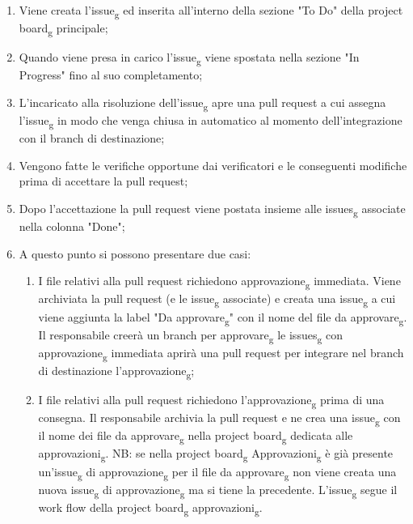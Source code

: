 \begin{enumerate}
	\item Viene creata l'issue\textsubscript{g} ed inserita all'interno della sezione "To Do" della project board\textsubscript{g} principale;
	\item Quando viene presa in carico l'issue\textsubscript{g} viene spostata nella sezione "In Progress" fino al suo completamento;
	\item L'incaricato alla risoluzione dell'issue\textsubscript{g} apre una pull request a cui assegna l'issue\textsubscript{g} in modo che  venga chiusa in automatico al momento dell'integrazione con il branch di destinazione;
	\item Vengono fatte le verifiche opportune dai verificatori e le conseguenti modifiche prima di accettare la pull request;
	\item Dopo l'accettazione la pull request viene postata insieme alle issues\textsubscript{g} associate nella colonna "Done";
	\item A questo punto si possono presentare due casi: 
	\begin{enumerate}
		\item I file relativi alla pull request richiedono approvazione\textsubscript{g} immediata.
		Viene archiviata la pull request (e le issue\textsubscript{g} associate) e creata una issue\textsubscript{g} a cui viene aggiunta la label "Da approvare\textsubscript{g}" con il nome del file da approvare\textsubscript{g}.
		Il responsabile creerà un branch per approvare\textsubscript{g} le issues\textsubscript{g} con approvazione\textsubscript{g} immediata aprirà una pull request per integrare nel branch di destinazione l'approvazione\textsubscript{g};
		\item I file relativi alla pull request richiedono l'approvazione\textsubscript{g} prima di una consegna.
		Il responsabile archivia la pull request e ne crea una issue\textsubscript{g} con il nome dei file da approvare\textsubscript{g} nella project board\textsubscript{g} dedicata alle approvazioni\textsubscript{g}.
		NB: se nella project board\textsubscript{g} Approvazioni\textsubscript{g} è già presente un'issue\textsubscript{g} di approvazione\textsubscript{g} per il file da approvare\textsubscript{g} non viene creata una nuova issue\textsubscript{g} di approvazione\textsubscript{g} ma si tiene la precedente.
		L'issue\textsubscript{g} segue il work flow della project board\textsubscript{g} approvazioni\textsubscript{g}.
	\end{enumerate}
\end{enumerate}
